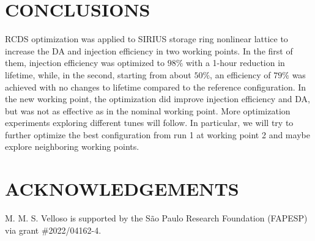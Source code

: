 \documentclass[a4paper,
               keeplastbox,   %
               ]{jacow}
\begin{document}
\section{CONCLUSIONS}
RCDS optimization was applied to SIRIUS storage ring nonlinear lattice to increase the DA and injection efficiency in two working points. In the first of them, injection efficiency was optimized to $98\%$ with a 1-hour reduction in lifetime, while, in the second, starting from about $50\%$, an efficiency of $79\%$ was achieved with no changes to lifetime compared to the reference configuration. In the new working point, the optimization did improve injection efficiency and DA, but was not as effective as in the nominal working point. More optimization experiments exploring different tunes will follow. In particular, we will try to further optimize the best configuration from run 1 at working point 2 and maybe explore neighboring working points.
\section{ACKNOWLEDGEMENTS}
M. M. S. Velloso is supported by the São Paulo Research Foundation (FAPESP) via grant \#2022/04162-4. 
%
%
	
\end{document}
